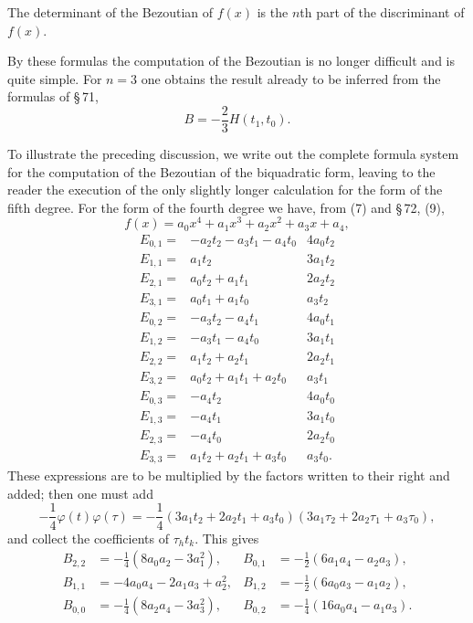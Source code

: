 \documentclass[11pt]{article}
\begin{document}
The determinant of the Bezoutian of $f(x)$ is the $n$th part of the discriminant of $f(x)$.

By these formulas the computation of the Bezoutian is no longer difficult and is quite simple. For $n=3$ one obtains the result already to be inferred from the formulas of \S\,71,
\begin{equation}
 B=-\frac23H(t_1,t_0).
\tag{13}
\end{equation}

To illustrate the preceding discussion, we write out the complete formula system for the computation of the Bezoutian of the biquadratic form, leaving to the reader the execution of the only slightly longer calculation for the form of the fifth degree. For the form of the fourth degree we have, from (7) and \S\,72, (9),
\[
 f(x)=a_0x^4+a_1x^3+a_2x^2+a_3x+a_4,
\]
\[
\begin{array}{rl|l}
E_{0,1}={}&-a_2t_2-a_3t_1-a_4t_0&4a_0t_2\\
E_{1,1}={}&a_1t_2&3a_1t_2\\
E_{2,1}={}&a_0t_2+a_1t_1&2a_2t_2\\
E_{3,1}={}&a_0t_1+a_1t_0&a_3t_2\\ \hline
E_{0,2}={}&-a_3t_2-a_4t_1&4a_0t_1\\
E_{1,2}={}&-a_3t_1-a_4t_0&3a_1t_1\\
E_{2,2}={}&a_1t_2+a_2t_1&2a_2t_1\\
E_{3,2}={}&a_0t_2+a_1t_1+a_2t_0&a_3t_1\\ \hline
E_{0,3}={}&-a_4t_2&4a_0t_0\\
E_{1,3}={}&-a_4t_1&3a_1t_0\\
E_{2,3}={}&-a_4t_0&2a_2t_0\\
E_{3,3}={}&a_1t_2+a_2t_1+a_3t_0&a_3t_0.
\end{array}
\]
These expressions are to be multiplied by the factors written to their right and added; then one must add
\[
 -\frac14\varphi(t)\varphi(\tau)
 =-\frac14(3a_1t_2+2a_2t_1+a_3t_0)(3a_1\tau_2+2a_2\tau_1+a_3\tau_0),
\]
and collect the coefficients of $\tau_ht_k$. This gives
\begin{equation}
\begin{aligned}
B_{2,2}&=-\frac14(8a_0a_2-3a_1^2),&
B_{0,1}&=-\frac12(6a_1a_4-a_2a_3),\\
B_{1,1}&=-4a_0a_4-2a_1a_3+a_2^2,&
B_{1,2}&=-\frac12(6a_0a_3-a_1a_2),\\
B_{0,0}&=-\frac14(8a_2a_4-3a_3^2),&
B_{0,2}&=-\frac14(16a_0a_4-a_1a_3).
\end{aligned}
\tag{14}
\end{equation}
\end{document}
